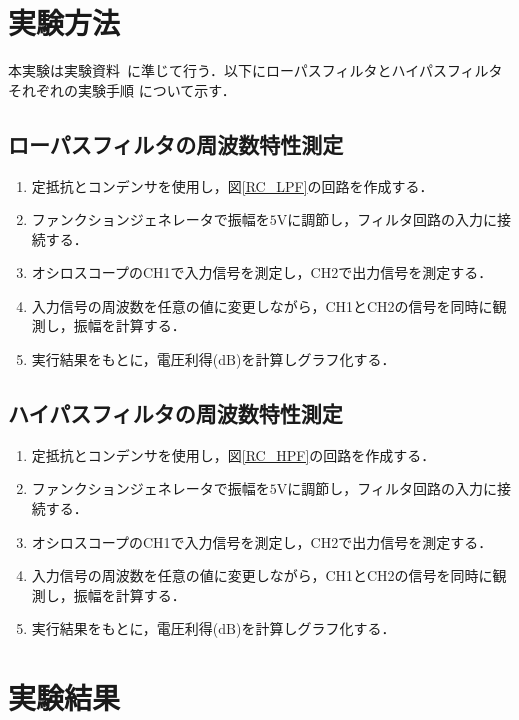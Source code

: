 \documentclass[a4paper,11pt]{jsarticle}
\begin{document}
\section{実験方法}
本実験は実験資料~\cite{text}に準じて行う．以下にローパスフィルタとハイパスフィルタそれぞれの実験手順
について示す．
\subsection{ローパスフィルタの周波数特性測定}
\begin{enumerate}
  \item 定抵抗とコンデンサを使用し，図\ref{RC_LPF}の回路を作成する．
  \item ファンクションジェネレータで振幅を$5\si{\volt}$に調節し，フィルタ回路の入力に接続する．
  \item オシロスコープのCH1で入力信号を測定し，CH2で出力信号を測定する．
  \item 入力信号の周波数を任意の値に変更しながら，CH1とCH2の信号を同時に観測し，振幅を計算する．
  \item 実行結果をもとに，電圧利得($\si{\deci \bel}$)を計算しグラフ化する．
\end{enumerate}
\subsection{ハイパスフィルタの周波数特性測定}
\begin{enumerate}
  \item 定抵抗とコンデンサを使用し，図\ref{RC_HPF}の回路を作成する．
  \item ファンクションジェネレータで振幅を$5\si{\volt}$に調節し，フィルタ回路の入力に接続する．
  \item オシロスコープのCH1で入力信号を測定し，CH2で出力信号を測定する．
  \item 入力信号の周波数を任意の値に変更しながら，CH1とCH2の信号を同時に観測し，振幅を計算する．
  \item 実行結果をもとに，電圧利得($\si{\deci \bel}$)を計算しグラフ化する．
\end{enumerate}

\section{実験結果}
\end{document}
